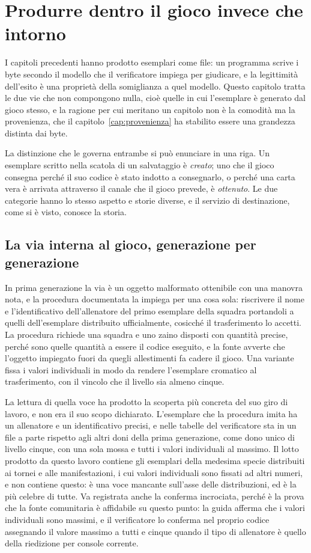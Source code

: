 \chapter{Produrre dentro il gioco invece che intorno}
\label{cap:dentro}

I capitoli precedenti hanno prodotto esemplari come file: un programma scrive i byte secondo il modello che il verificatore impiega per giudicare, e la legittimità dell'esito è una proprietà della somiglianza a quel modello. Questo capitolo tratta le due vie che non compongono nulla, cioè quelle in cui l'esemplare è generato dal gioco stesso, e la ragione per cui meritano un capitolo non è la comodità ma la provenienza, che il capitolo~\ref{cap:provenienza} ha stabilito essere una grandezza distinta dai byte.

La distinzione che le governa entrambe si può enunciare in una riga. Un esemplare scritto nella scatola di un salvataggio è \emph{creato}; uno che il gioco consegna perché il suo codice è stato indotto a consegnarlo, o perché una carta vera è arrivata attraverso il canale che il gioco prevede, è \emph{ottenuto}. Le due categorie hanno lo stesso aspetto e storie diverse, e il servizio di destinazione, come si è visto, conosce la storia.

\section{La via interna al gioco, generazione per generazione}

In prima generazione la via è un oggetto malformato ottenibile con una manovra nota, e la procedura documentata la impiega per una cosa sola: riscrivere il nome e l'identificativo dell'allenatore del primo esemplare della squadra portandoli a quelli dell'esemplare distribuito ufficialmente, cosicché il trasferimento lo accetti. La procedura richiede una squadra e uno zaino disposti con quantità precise, perché sono quelle quantità a essere il codice eseguito, e la fonte avverte che l'oggetto impiegato fuori da quegli allestimenti fa cadere il gioco. Una variante fissa i valori individuali in modo da rendere l'esemplare cromatico al trasferimento, con il vincolo che il livello sia almeno cinque.

La lettura di quella voce ha prodotto la scoperta più concreta del suo giro di lavoro, e non era il suo scopo dichiarato. L'esemplare che la procedura imita ha un allenatore e un identificativo precisi, e nelle tabelle del verificatore sta in un file a parte rispetto agli altri doni della prima generazione, come dono unico di livello cinque, con una sola mossa e tutti i valori individuali al massimo. Il lotto prodotto da questo lavoro contiene gli esemplari della medesima specie distribuiti ai tornei e alle manifestazioni, i cui valori individuali sono fissati ad altri numeri, e non contiene questo: è una voce mancante sull'asse delle distribuzioni, ed è la più celebre di tutte. Va registrata anche la conferma incrociata, perché è la prova che la fonte comunitaria è affidabile su questo punto: la guida afferma che i valori individuali sono massimi, e il verificatore lo conferma nel proprio codice assegnando il valore massimo a tutti e cinque quando il tipo di allenatore è quello della riedizione per console corrente.

